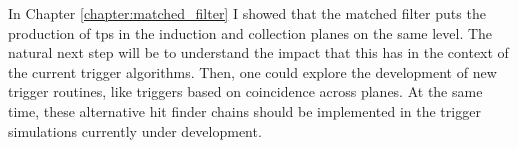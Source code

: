 \begin{comment}
The \gls{daq} system of the \gls{dune} \gls{fd} relies on the online identification of hits on channels, the so-called \gls{tp}s, to form decisions data to store. The goal of Chapter \ref{chapter:matched_filter} is to motivate a method to enhance the production of \gls{tp}s in the induction channels of the detectors. Forming \gls{tp}s from all the charge readout planes will improve the redundancy of the trigger algorithms. Not only that, but this may be the key to have more complex trigger logic that requires directional information. The aspect I focused on to improve the hit finding is the filtering of the waveforms. In section \ref{sec:matched_filter_fir} I use a sample of ProtoDUNE-SP cosmic data to show how different low-pass FIR filters affect the S/N in the collection and induction planes. Then, I introduce the concept of the matched filter in section \ref{sec:matched_filter_matched_filter}. Using the same dataset, I demonstrate that the improvement in the S/N of the induction channels achieved with these filters can be significantly higher than with the standard filter approach. A series of studies using MC samples are presented in section \ref{sec:matched_filter_mc_studies}. These allow to study the dependence of the filtering on the orientation and the energy of the tracks. I also use them to assess the impact of this method on the hit sensitivity. Finally, in section \ref{sec:matched_filter_vdcoldbox} I briefly summarise the results from the VD ColdBox runs which featured the matched filter.

With these studies, I showed that the matched filter puts the production of \gls{tp}s in the induction and collection planes on the same level. The natural next step will be to understand the impact that this has in the context of the current trigger algorithms. Then, explore the development of new trigger routines, like triggers based on coincidence across planes. At the same time, these alternative hit finder chains should be implemented in the trigger simulations currently under development.
\end{comment}

In Chapter \ref{chapter:matched_filter} I showed that the matched filter puts the production of \gls{tp}s in the induction and collection planes on the same level. The natural next step will be to understand the impact that this has in the context of the current trigger algorithms. Then, one could explore the development of new trigger routines, like triggers based on coincidence across planes. At the same time, these alternative hit finder chains should be implemented in the trigger simulations currently under development.

